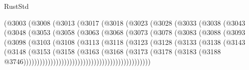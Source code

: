 \begin{lexlean}{RustStd}
\begin{coremodule}
                    (@3003
                      (@3008
                        (@3013
                          (@3017
                            (@3018
                              (@3023
                                (@3028
                                  (@3033
                                    (@3038
                                      (@3043
                                        (@3048
                                          (@3053
                                            (@3058
                                              (@3063
                                                (@3068
                                                  (@3073
                                                    (@3078
                                                      (@3083
                                                        (@3088
                                                          (@3093
                                                            (@3098
                                                              (@3103
                                                                (@3108
                                                                  (@3113
                                                                    (@3118
                                                                      (@3123
                                                                        (@3128
                                                                          (@3133
                                                                            (@3138
                                                                              (@3143
                                                                                (@3148
                                                                                  (@3153
                                                                                    (@3158
                                                                                      (@3163
                                                                                        (@3168
                                                                                          (@3173
                                                                                            (@3178
                                                                                              (@3183
                                                                                                (@3188
                                                                                                  @3746)))))))))))))))))))))))))))))))))))))))))))))))

\end{coremodule}
\end{lexlean}
